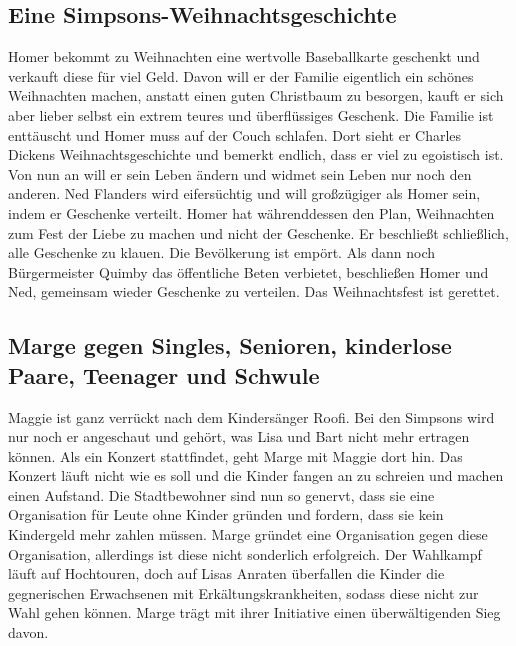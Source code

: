 \subsection{Eine Simpsons-Weihnachtsgeschichte}
Homer bekommt zu Weihnachten eine wertvolle Baseballkarte geschenkt und verkauft diese für viel Geld. Davon will er der Familie eigentlich ein schönes Weihnachten machen, anstatt einen guten Christbaum zu besorgen, kauft er sich aber lieber selbst ein extrem teures und überflüssiges Geschenk. Die Familie ist enttäuscht und Homer muss auf der Couch schlafen. Dort sieht er Charles Dickens Weihnachtsgeschichte und bemerkt endlich, dass er viel zu egoistisch ist. Von nun an will er sein Leben ändern und widmet sein Leben nur noch den anderen. Ned Flanders wird eifersüchtig und will großzügiger als Homer sein, indem er Geschenke verteilt. Homer hat währenddessen den Plan, Weihnachten zum Fest der Liebe zu machen und nicht der Geschenke. Er beschließt schließlich, alle Geschenke zu klauen. Die Bevölkerung ist empört. Als dann noch Bürgermeister Quimby das öffentliche Beten verbietet, beschließen Homer und Ned, gemeinsam wieder Geschenke zu verteilen. Das Weihnachtsfest ist gerettet.



\subsection{Marge gegen Singles, Senioren, kinderlose Paare, Teenager und Schwule}\label{FABF03}
Maggie ist ganz verrückt nach dem Kindersänger Roofi. Bei den Simpsons wird nur noch er angeschaut und gehört, was Lisa und Bart nicht mehr ertragen können. Als ein Konzert stattfindet, geht Marge mit Maggie dort hin. Das Konzert läuft nicht wie es soll und die Kinder fangen an zu schreien und machen einen Aufstand. Die Stadtbewohner sind nun so genervt, dass sie eine Organisation für Leute ohne Kinder gründen und fordern, dass sie kein Kindergeld mehr zahlen müssen. Marge gründet eine Organisation gegen diese Organisation, allerdings ist diese nicht sonderlich erfolgreich. Der Wahlkampf läuft auf Hochtouren, doch auf Lisas Anraten überfallen die Kinder die gegnerischen Erwachsenen mit Erkältungskrankheiten, sodass diese nicht zur Wahl gehen können. Marge trägt mit ihrer Initiative einen überwältigenden Sieg davon.

